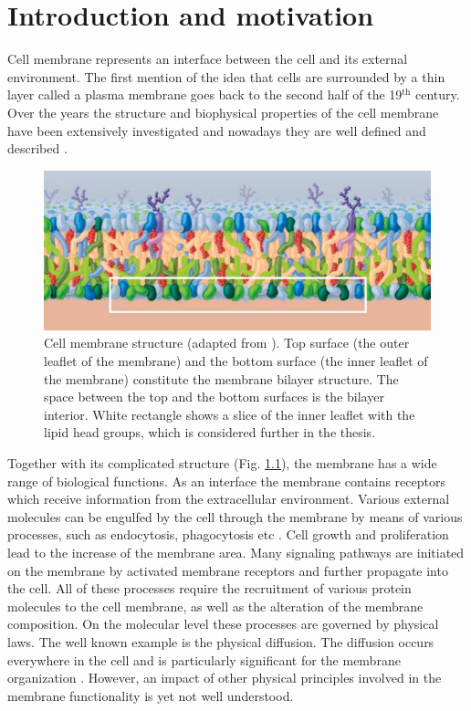 \chapter{Introduction and motivation}

Cell membrane represents an interface between the cell and its external environment. The first mention of the idea that cells are surrounded by a thin layer called a plasma membrane goes back to the second half of the 19$^{\text{th}}$ century. Over the years the structure and biophysical properties of the cell membrane have been extensively investigated and nowadays they are well defined and described \cite{Edidin2003}.

\begin{figure}[!ht]
\begin{center}
 \includegraphics[scale = 0.54]{../figures/membrane_selected.pdf}
\end{center}
\caption[Cell membrane structure]{Cell membrane structure (adapted from \cite{Pollard2008}). Top surface (the outer leaflet of the membrane) and the bottom surface (the inner leaflet of the membrane) constitute the membrane bilayer structure. The space between the top and the bottom surfaces is the bilayer interior. White rectangle shows a slice of the inner leaflet with the lipid head groups, which is considered further in the thesis.}
\label{fig:membrane_from_book}
\end{figure}

Together with its complicated structure (Fig. \ref{fig:membrane_from_book}), the membrane has a wide range of biological functions. As an interface the membrane contains receptors which receive information from the extracellular environment. Various external molecules can be engulfed by the cell through the membrane by means of various processes, such as endocytosis, phagocytosis etc \cite{Doherty2009}. Cell growth and proliferation lead to the increase of the membrane area. Many signaling pathways are initiated on the membrane by activated membrane receptors and further propagate into the cell. All of these processes require the recruitment of various protein molecules to the cell membrane, as well as the alteration of the membrane composition. On the molecular level these processes are governed by physical laws. The well known example is the physical diffusion. The diffusion occurs everywhere in the cell and is particularly significant for the membrane organization \cite{Tocanne1989}. However, an impact of other physical principles involved in the membrane functionality is yet not well understood.

